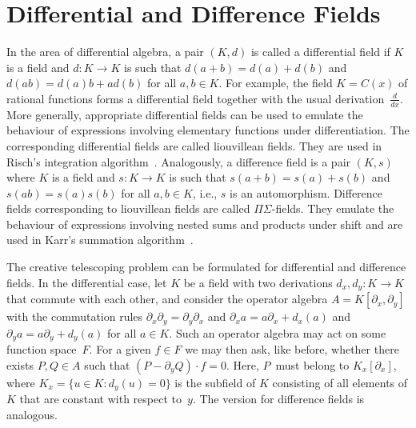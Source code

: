 \documentclass[a4paper,draft]{amsart}
\begin{document}
 \section{Differential and Difference Fields}\label{sec:2}

 In the area of differential algebra, a pair $(K,d)$ is called a differential
 field if $K$ is a field and $d\colon K\to K$ is such that $d(a+b)=d(a)+d(b)$
 and $d(ab)=d(a)b+ad(b)$ for all $a,b\in K$. For example, the field $K=C(x)$ of
 rational functions forms a differential field together with the usual
 derivation~$\frac d{dx}$.  More generally, appropriate differential fields can
 be used to emulate the behaviour of expressions involving elementary functions
 under differentiation. The corresponding differential fields are called
 liouvillean fields. They are used in Risch's integration
 algorithm~\cite{risch69,risch70,bronstein97,bronstein98}. Analogously, a difference field is a pair $(K,s)$
 where $K$ is a field and $s\colon K\to K$ is such that $s(a+b)=s(a)+s(b)$ and
 $s(ab)=s(a)s(b)$ for all $a,b\in K$, i.e., $s$ is an automorphism. Difference
 fields corresponding to liouvillean fields are called $\Pi\Sigma$-fields.
 They emulate the behaviour of expressions involving nested
 sums and products under shift and are used in Karr's summation
 algorithm~\cite{karr81,karr85}.

 The creative telescoping problem can be formulated for differential and
 difference fields.  In the differential case, let $K$ be a field with two
 derivations $d_x,d_y\colon K\to K$ that commute with each other, and consider
 the operator algebra $A=K[\partial_x,\partial_y]$ with the commutation rules
 $\partial_x\partial_y=\partial_y\partial_x$ and $\partial_x a = a\partial_x +
 d_x(a)$ and $\partial_y a = a\partial_y + d_y(a)$ for all $a\in K$. Such an
 operator algebra may act on some function space~$F$. For a given $f\in F$ we
 may then ask, like before, whether there exists $P,Q\in A$ such that
 $(P-\partial_yQ)\cdot f=0$. Here, $P$~must belong to $K_x[\partial_x]$, where
 $K_x=\{u\in K:d_y(u)=0\}$ is the subfield of $K$ consisting of all elements of
 $K$ that are constant with respect to~$y$. The version for difference fields
 is analogous.
\end{document}
